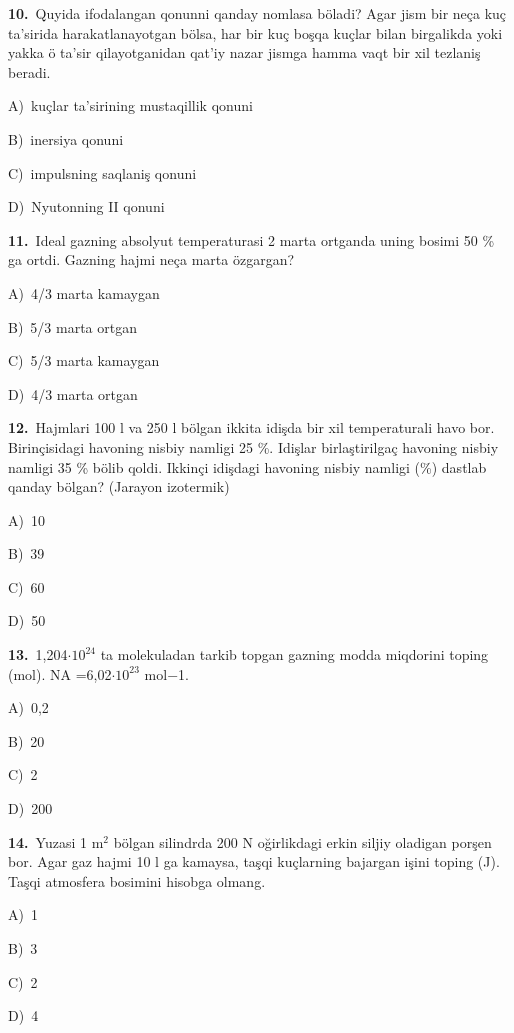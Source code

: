 \documentclass[11pt,a4paper]{article}
\newcommand{\opt}[2]{\hspace*{4mm}#1)\ #2\par}
\begin{document}
\noindent\begin{minipage}{\linewidth}
\textbf{10.}\ Quyida ifodalangan qonunni qanday nomlasa böladi? Agar jism bir neça kuç ta’sirida harakatlanayotgan bölsa, har bir kuç boşqa kuçlar bilan birgalikda yoki yakka ö ta’sir qilayotganidan qat’iy nazar jismga hamma vaqt bir xil tezlaniş beradi.\par\smallskip
\opt{A}{kuçlar ta’sirining mustaqillik qonuni}
\opt{B}{inersiya qonuni}
\opt{C}{impulsning saqlaniş qonuni}
\opt{D}{Nyutonning II qonuni}
\end{minipage}\vspace{9pt}\par
\noindent\begin{minipage}{\linewidth}
\textbf{11.}\ Ideal gazning absolyut temperaturasi 2 marta ortganda uning bosimi 50 \% ga ortdi. Gazning hajmi neça marta özgargan?\par\smallskip
\opt{A}{4/3 marta kamaygan}
\opt{B}{5/3 marta ortgan}
\opt{C}{5/3 marta kamaygan}
\opt{D}{4/3 marta ortgan}
\end{minipage}\vspace{9pt}\par
\noindent\begin{minipage}{\linewidth}
\textbf{12.}\ Hajmlari 100 l va 250 l bölgan ikkita idişda bir xil temperaturali havo bor. Birinçisidagi havoning nisbiy namligi 25 \%. Idişlar birlaştirilgaç havoning nisbiy namligi 35 \% bölib qoldi. Ikkinçi idişdagi havoning nisbiy namligi (\%) dastlab qanday bölgan? (Jarayon izotermik)\par\smallskip
\opt{A}{10}
\opt{B}{39}
\opt{C}{60}
\opt{D}{50}
\end{minipage}\vspace{9pt}\par
\noindent\begin{minipage}{\linewidth}
\textbf{13.}\ 1,204$\cdot10^{24}$ ta molekuladan tarkib topgan gazning modda miqdorini toping (mol). NA =6,02$\cdot10^{23}$ mol$-$1.\par\smallskip
\opt{A}{0,2}
\opt{B}{20}
\opt{C}{2}
\opt{D}{200}
\end{minipage}\vspace{9pt}\par
\noindent\begin{minipage}{\linewidth}
\textbf{14.}\ Yuzasi 1 m$^{2}$ bölgan silindrda 200 N oğirlikdagi erkin siljiy oladigan porşen bor. Agar gaz hajmi 10 l ga kamaysa, taşqi kuçlarning bajargan işini toping (J). Taşqi atmosfera bosimini hisobga olmang.\par\smallskip
\opt{A}{1}
\opt{B}{3}
\opt{C}{2}
\opt{D}{4}
\end{minipage}\vspace{9pt}\par
\end{document}
